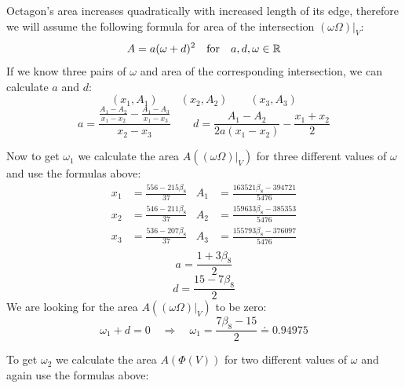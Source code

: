 \documentclass[text.tex]{subfiles}
\begin{document}
Octagon's area increases quadratically with increased length of its edge, therefore we will assume the following formula for area of the intersection $(\omega\Omega)|_V$: 
$$A = a(\omega+d)^2 \quad\text{for}\quad a,d,\omega\in\mathbb{R}$$
If we know three pairs of $\omega$ and area of the corresponding intersection, we can calculate $a$ and $d$:
$$(x_1,A_1) \qquad (x_2,A_2) \qquad (x_3,A_3)$$
$$a = \frac{\frac{A_1-A_2}{x_1-x_2}-\frac{A_1-A_3}{x_1-x_3}}{x_2-x_3} \qquad d=\frac{A_1-A_2}{2a(x_1-x_2)}-\frac{x_1+x_2}{2}$$

Now to get $\omega_1$ we calculate the area $A((\omega\Omega)|_V)$ for three different values of $\omega$ and use the formulas above: 
\begin{align*}
x_1&=\frac{556-215\beta_8}{37} & A_1&=\frac{163521\beta_8-394721}{5476} \\
x_2&=\frac{546-211\beta_8}{37} & A_2&=\frac{159633\beta_8-385353}{5476} \\
x_3&=\frac{536-207\beta_8}{37} & A_3&=\frac{155793\beta_8-376097}{5476} \\
\end{align*}
$$a = \frac{1+3\beta_8}{2}$$
$$d = \frac{15-7\beta_8}{2}$$
We are looking for the area $A((\omega\Omega)|_V)$ to be zero:
$$\omega_1+d=0\quad\Rightarrow\quad \omega_1 = \frac{7\beta_8-15}{2}\doteq 0.94975$$

To get $\omega_2$ we calculate the area $A(\Phi(V))$ for two different values of $\omega$ and again use the formulas above: 
\end{document}
